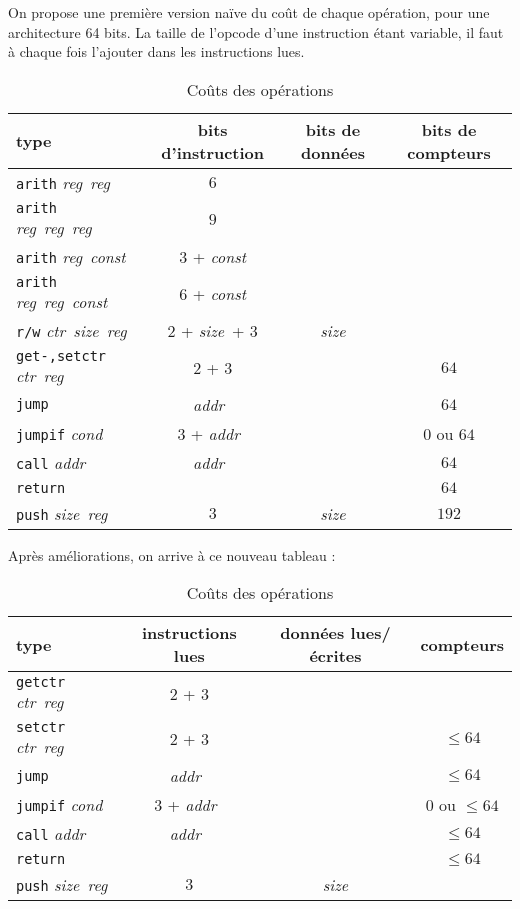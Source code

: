 \documentclass[architecture]{compas2018}
\newcommand{\reg}{\textit{reg}}
\newcommand{\const}{\textit{const}}
\newcommand{\cond}{\textit{cond}}
\newcommand{\ctr}{\textit{ctr}}
\newcommand{\size}{\textit{size}}
\newcommand{\addr}{\textit{addr}}
\begin{document}
\begin{table}[!h]
  \caption{Coûts des opérations}
  \label{tab:costs}
  On propose une première version naïve du coût de chaque opération, pour une architecture 64 bits. La taille de l'opcode d'une instruction étant variable, il faut à chaque fois l'ajouter dans les instructions lues.
  \begin{center}
  \begin{tabular}{|l|c|c|c|}
    \hline  
    type  & bits d'instruction & bits de données & bits de compteurs \\
    \hline  
    \hline
    \texttt{arith} \reg\ \reg\ &  $6$ & & \\
    \hline
    \texttt{arith} \reg\ \reg\ \reg\ & $9$ & & \\
    \hline
    \texttt{arith} \reg\ \const\ & $3$ + \const & & \\
    \hline
    \texttt{arith} \reg\ \reg\ \const\ & $6$ + \const & & \\
    \hline
    \texttt{r/w} \ctr\ \size\ \reg & $2$ + \size\ + $3$ & \size & \\
    \hline
    \texttt{get-,setctr} \ctr\ \reg\ & $2$ + $3$ & & $64$ \\
    \hline
    \texttt{jump} & \addr\ & & $64$ \\
    \hline
    \texttt{jumpif} \cond & $3$ + \addr\ & & $0$ ou $64$\\
    \hline
    \texttt{call} \addr & \addr\ & & $64$\\
    \hline
    \texttt{return} & & & $64$\\
    \hline
    \texttt{push} \size\ \reg & $3$ & \size & $192$\\
    \hline
  \end{tabular}
  \end{center}
Après améliorations, on arrive à ce nouveau tableau :
  \begin{center}
    \begin{tabular}{|l|c|c|c|}
      \hline  
      type  & instructions lues & données lues/écrites & compteurs \\
      \hline  
      \hline
      \texttt{getctr} \ctr\ \reg\ & $2$ + $3$ & & \\
      \hline
      \texttt{setctr} \ctr\ \reg\ & $2$ + $3$ & & $\leqslant 64$ \\
      \hline
      \texttt{jump} & \addr\ & & $\leqslant 64$ \\
      \hline
      \texttt{jumpif} \cond & $3$ + \addr\ & & $0$ ou $\leqslant 64$\\
      \hline
      \texttt{call} \addr & \addr\ & & $\leqslant 64$\\
      \hline
      \texttt{return} & & & $\leqslant64$\\
      \hline
      \texttt{push} \size\ \reg & $3$ & \size &\\
      \hline
    \end{tabular}
  \end{center}
\end{table}
  

\end{document}
